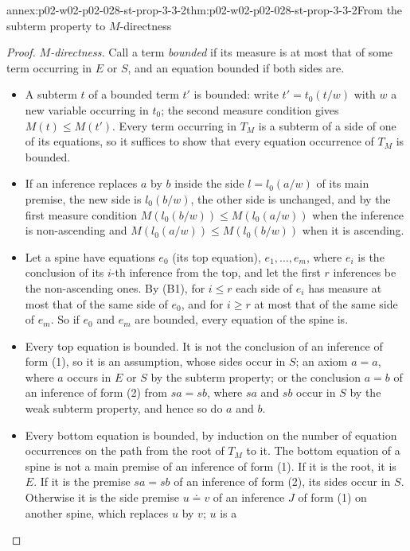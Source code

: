 \begin{annexitem}{annex:p02-w02-p02-028-st-prop-3-3-2}{thm:p02-w02-p02-028-st-prop-3-3-2}{From the subterm property to \(M\)-directness}
\begin{proof}
\emph{\(M\)-directness.}  Call a term \emph{bounded} if its measure is at most
that of some term occurring in \(E\) or \(S\), and an equation bounded if
both sides are.
\begin{itemize}
  \item[(B0)] A subterm \(t\) of a bounded term \(t'\) is bounded: write
        \(t'=t_0(t/w)\) with \(w\) a new variable occurring in \(t_0\); the
        second measure condition gives \(M(t)\leq M(t')\).  Every term
        occurring in \(T_M\) is a subterm of a side of one of its equations,
        so it suffices to show that every equation occurrence of \(T_M\) is
        bounded.
  \item[(B1)] If an inference replaces \(a\) by \(b\) inside the side
        \(l=l_0(a/w)\) of its main premise, the new side is \(l_0(b/w)\), the
        other side is unchanged, and by the first measure condition
        \(M(l_0(b/w))\leq M(l_0(a/w))\) when the inference is non-ascending
        and \(M(l_0(a/w))\leq M(l_0(b/w))\) when it is ascending.
  \item[(B2)] Let a spine have equations \(e_0\) (its top equation),
        \(e_1,\ldots,e_m\), where \(e_i\) is the conclusion of its \(i\)-th
        inference from the top, and let the first \(r\) inferences be the
        non-ascending ones.  By (B1), for \(i\leq r\) each side of \(e_i\)
        has measure at most that of the same side of \(e_0\), and for
        \(i\geq r\) at most that of the same side of \(e_m\).  So if \(e_0\)
        and \(e_m\) are bounded, every equation of the spine is.
  \item[(B3)] Every top equation is bounded.  It is not the conclusion of an
        inference of form (1), so it is an assumption, whose sides occur in
        \(S\); an axiom \(a=a\), where \(a\) occurs in \(E\) or \(S\) by the
        subterm property; or the conclusion \(a=b\) of an inference of form
        (2) from \(sa=sb\), where \(sa\) and \(sb\) occur in \(S\) by the weak
        subterm property, and hence so do \(a\) and \(b\).
  \item[(B4)] Every bottom equation is bounded, by induction on the number of
        equation occurrences on the path from the root of \(T_M\) to it.  The
        bottom equation of a spine is not a main premise of an inference of
        form (1).  If it is the root, it is \(E\).  If it is the premise
        \(sa=sb\) of an inference of form (2), its sides occur in \(S\).
        Otherwise it is the side premise \(u\doteq v\) of an inference \(J\)
        of form (1) on another spine, which replaces \(u\) by \(v\); \(u\) is a

\end{itemize}
\end{proof}
\end{annexitem}
